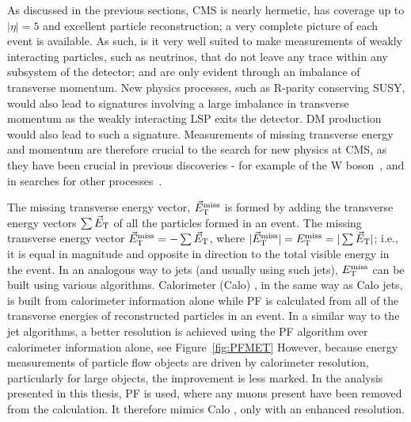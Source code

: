 As discussed in the previous sections, \ac{CMS} is nearly hermetic, has coverage up to $|\eta| = 5$ and excellent particle reconstruction; a very complete picture of each event is available. 
As such, is it very well suited to make measurements of weakly interacting particles, such as neutrinos, that do not leave any trace within any subsystem of the detector; and are only evident through an imbalance of transverse momentum.
New physics processes, such as R-parity conserving \ac{SUSY}, would also lead to signatures involving a large imbalance in transverse momentum as the weakly interacting \ac{LSP} exits the detector. \ac{DM} production would also lead to such a signature.
Measurements of missing transverse energy and momentum are therefore crucial to the search for new physics at \ac{CMS}, as they have been crucial in previous discoveries - for example of the W boson~\cite{bib:Wdiscovery}, and in searches for other processes~\cite{Albajar:173124,Albajar:173125}. 

The missing transverse energy vector, $\vec{E}_{\text{T}}^{\text{miss}}$ is formed by adding the transverse energy vectors $\sum \vec{E}_{\text{T}}$ of all the particles formed in an event. The missing transverse energy vector $\vec{E}_{\text{T}}^{\text{miss}} = - \sum \vec{E}_{\text{T}}$, where $|\vec{E}_{\text{T}}^{\text{miss}}| = E_{\text{T}}^{\text{miss}} = |\sum \vec{E}_{\text{T}}|$; i.e., it is equal in magnitude and opposite in direction to the total visible energy in the event.
In an analogous way to jets (and usually using such jets), $E_{\text{T}}^{\text{miss}}$ can be built using various algorithms. 
Calorimeter (Calo) \MET, in the same way as Calo jets, is built from calorimeter information alone while
\ac{PF} \MET is calculated from all of the transverse energies of reconstructed particles in an event. 
In a similar way to the jet algorithms, a better resolution is achieved using the \ac{PF} algorithm over calorimeter information alone, see Figure~\ref{fig:PFMET}
However, because energy measurements of particle flow objects are driven by calorimeter resolution, particularly for large \ET objects, the improvement is less marked.
In the analysis presented in this thesis, \ac{PF} \MET is used, where any muons present have been removed from the  calculation. It therefore mimics Calo \MET, only with an enhanced resolution. 

